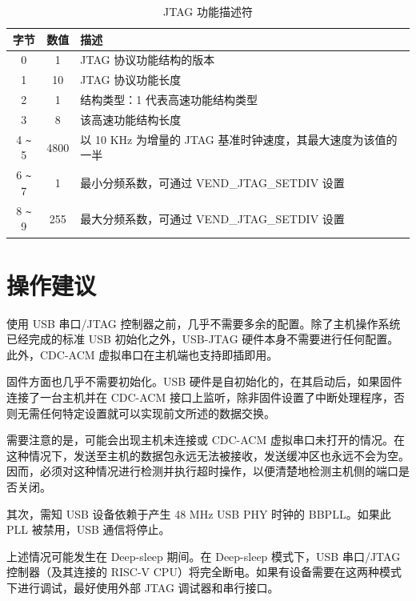 \documentclass[main\_\_CN.tex]{subfiles}
\begin{document}
\begin{table}[H]
    \centering
    \caption{JTAG 功能描述符}
    \label{tab:usbserialjtag-capabilities-descriptor}
    \begin{tabular}{ |c|c|l| }
    \hline
        \rowcolor{lightgray}
        \textbf{字节} & \textbf{数值} & \textbf{描述} \\\hline

        0 &    1 &     JTAG 协议功能结构的版本 \\\hline
        1 &    10 &    JTAG 协议功能长度 \\\hline
        2 &    1 &     结构类型：1 代表高速功能结构类型 \\\hline
        3 &    8 &     该高速功能结构长度 \\\hline
        4 \verb+~+ 5 &  4800 &  以 10 KHz 为增量的 JTAG 基准时钟速度，其最大速度为该值的一半\\\hline
        6 \verb+~+ 7 &  1 &     最小分频系数，可通过 VEND\_JTAG\_SETDIV 设置 \\\hline
        8 \verb+~+ 9 &  255 &   最大分频系数，可通过 VEND\_JTAG\_SETDIV 设置 \\\hline
    \end{tabular}
\end{table}


\section{操作建议}
\label{sec:usbserialjtag-recommended-operation}

使用 USB 串口/JTAG 控制器之前，几乎不需要多余的配置。除了主机操作系统已经完成的标准 USB 初始化之外，USB-JTAG 硬件本身不需要进行任何配置。此外，CDC-ACM 虚拟串口在主机端也支持即插即用。

固件方面也几乎不需要初始化。USB 硬件是自初始化的，在其启动后，如果固件连接了一台主机并在 CDC-ACM 接口上监听，除非固件设置了中断处理程序，否则无需任何特定设置就可以实现前文所述的数据交换。

需要注意的是，可能会出现主机未连接或 CDC-ACM 虚拟串口未打开的情况。在这种情况下，发送至主机的数据包永远无法被接收，发送缓冲区也永远不会为空。因而，必须对这种情况进行检测并执行超时操作，以便清楚地检测主机侧的端口是否关闭。

其次，需知 USB 设备依赖于产生 48 MHz USB PHY 时钟的 BBPLL。如果此 PLL 被禁用，USB 通信将停止。

上述情况可能发生在 Deep-sleep 期间。在 Deep-sleep 模式下，USB 串口/JTAG 控制器（及其连接的 RISC-V CPU）将完全断电。如果有设备需要在这两种模式下进行调试，最好使用外部 JTAG 调试器和串行接口。
\end{document}
